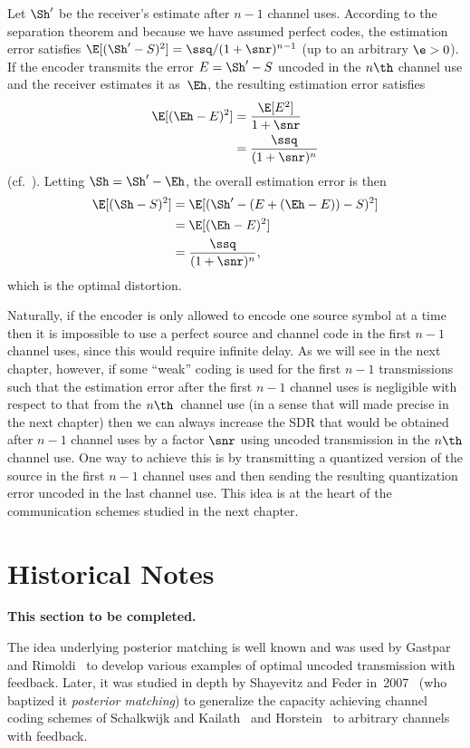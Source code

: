 Let $\Sh'$ be the receiver's estimate after $n-1$ channel uses. According to the
separation theorem and because we have assumed perfect codes,
the estimation error satisfies $\E[(\Sh' - S)^2] = \ssq / (1 + \snr)^{n-1}$ (up
to an arbitrary $\e > 0$). If the encoder transmits the error $E = \Sh' - S$
uncoded in the $n\th$ channel use and the receiver estimates it as~$\Eh$, the
resulting estimation error satisfies
\begin{align*}
  \E[(\Eh - E)^2] &= \frac{\E[E^2]}{ 1 + \snr } \\
  &= \frac{\ssq}{(1 + \snr)^n}
\end{align*}
(cf.~).
Letting $\Sh = \Sh' - \Eh$, the overall estimation error is then 
\begin{align*}
  \E[(\Sh - S)^2] &= \E[(\Sh' - (E + (\Eh - E)) - S)^2] \\
  &= \E[(\Eh - E)^2] \\
  &= \frac{\ssq}{(1 + \snr)^n},
\end{align*}
which is the optimal distortion. 

Naturally, if the encoder is only allowed to encode one source symbol at a time
then it is impossible to use a perfect source and channel code in the first
$n-1$ channel uses, since this would require infinite delay. As we will see in
the next chapter, however, if some ``weak'' coding is used for the first $n-1$
transmissions such that the estimation error after the first $n-1$ channel uses
is negligible with respect to that from the $n\th$~channel use (in a sense that
will made precise in the next chapter) then we can always increase the SDR that
would be obtained after $n-1$ channel uses by a factor $\snr$ using uncoded
transmission in the $n\th$ channel use. One way to achieve this is by
transmitting a quantized version of the source in the first $n-1$ channel uses
and then sending the resulting quantization error uncoded in the last channel
use. This idea is at the heart of the communication schemes studied in the next
chapter.


\section{Historical Notes}

\textbf{This section to be completed.}

The idea underlying posterior matching is well known and was used by Gastpar and
Rimoldi~\cite{GastparR2003} to develop various examples of optimal uncoded
transmission with feedback.  Later, it was studied in depth by Shayevitz and
Feder in~2007~\cite{ShayevitzF2007,ShayevitzF2008} (who baptized it
\emph{posterior matching}) to generalize the capacity achieving channel coding
schemes of Schalkwijk and Kailath~\cite{SchalkwijkK1966} and
Horstein~\cite{Horstein1963} to arbitrary channels with feedback.



